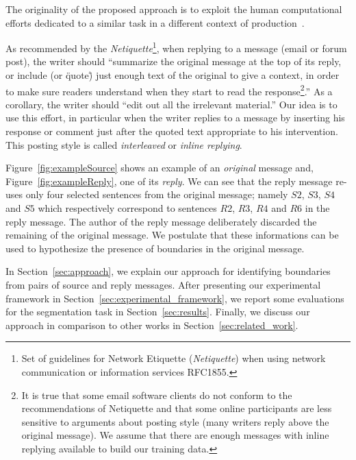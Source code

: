 The originality of the proposed approach is to exploit the human computational efforts dedicated to a similar task in a different context of production~\cite{ahn:2006:computer}. 

As recommended by the \textit{Netiquette}\footnote{Set of guidelines for Network Etiquette (\textit{Netiquette}) when using network communication or information services RFC1855.}, when replying to a message (email or forum post), the writer should ``summarize the original message at the top of its reply, or include (or \"quote\") just enough text of the original to give a context, in order to make sure readers understand when they start to read the response\footnote{It is true that some email software clients do not conform to the recommendations of Netiquette and that some online participants are less sensitive to arguments about posting style (many writers reply above  the original message). We assume that there are enough messages with inline replying available to build our training data.}.''  As a corollary, the writer should ``edit out all the irrelevant material.''
%
Our idea is to use this effort, in particular when the writer replies to a message by inserting his response or comment just after the quoted text appropriate to his intervention. 
%
This posting style is called \textit{interleaved} or \textit{inline replying}.
%

Figure~\ref{fig:exampleSource} shows an example of an \textit{original} message and, Figure~\ref{fig:exampleReply}, one of its \textit{reply}.
%
We can see that the reply message re-uses only four selected sentences from the original message; namely $S2$, $S3$, $S4$ and $S5$ which respectively correspond to sentences  $R2$, $R3$, $R4$ and $R6$ in the reply message.
%
The author of the reply message deliberately discarded the remaining of the original message.
%
We postulate that these informations can be used to hypothesize the presence of boundaries in the original message. 

In Section~\ref{sec:approach}, we explain our approach for identifying boundaries from pairs of source and reply messages.
%
After presenting our experimental framework in Section~\ref{sec:experimental_framework}, we report some evaluations for the segmentation task in Section~\ref{sec:results}.
%
Finally, we discuss our approach in comparison to other works in Section~\ref{sec:related_work}.